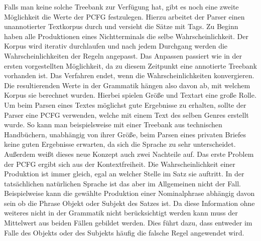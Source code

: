 Falls man keine solche Treebank zur Verfügung hat, gibt es noch eine zweite Möglichkeit die Werte der PCFG festzulegen. Hierzu arbeitet der Parser einen unannotierter Textkorpus durch und versieht die Sätze mit Tags. Zu Beginn haben alle Produktionen eines Nichtterminals die selbe Wahrscheinlichkeit. Der Korpus wird iterativ durchlaufen und nach jedem Durchgang werden die Wahrscheinlichkeiten der Regeln angepasst. Das Anpassen passiert wie in der ersten vorgestellten Möglichkeit, da zu diesem Zeitpunkt eine annotierte Treebank vorhanden ist. Das Verfahren endet, wenn die Wahrscheinlichkeiten konvergieren. \\
Die resultierenden Werte in der Grammatik hängen also davon ab, mit welchem Korpus sie berechnet wurden. Hierbei spielen Größe und Textart eine große Rolle. Um beim Parsen eines Textes möglichst gute Ergebnisse zu erhalten, sollte der Parser eine PCFG verwenden, welche mit einem Text des selben Genres erstellt wurde. So kann man beispielsweise mit einer Treebank aus technischen Handbüchern, unabhängig von ihrer Größe, beim Parsen eines privaten Briefes keine guten Ergebnisse erwarten, da sich die Sprache zu sehr unterscheidet.\\ %
Außerdem weißt dieses neue Konzept auch zwei Nachteile auf.
Das erste Problem der PCFG ergibt sich aus der Kontextfreiheit. Die Wahrscheinlichkeit einer Produktion ist immer gleich, egal an welcher Stelle im Satz sie auftritt. In der tatsächlichen natürlichen Sprache ist das aber im Allgemeinen nicht der Fall. Beispielweise kann die gewählte Produktion einer Nominalphrase abhängig davon sein ob die Phrase Objekt oder Subjekt des Satzes ist. Da diese Information ohne weiteres nicht in der Grammatik nicht berücksichtigt werden kann muss der Mittelwert aus beiden Fällen gebildet werden. Dies führt dazu, dass entweder im Falle des Objekts oder des Subjekts häufig die falsche Regel angewendet wird. 
